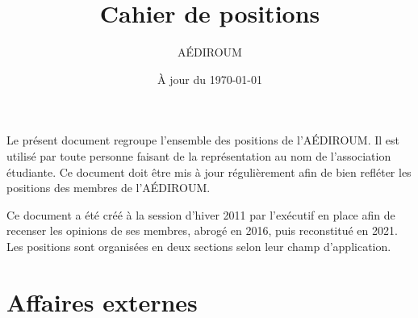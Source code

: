 \documentclass[twoside]{article}
\title{Cahier de positions}
\author{AÉDIROUM}
\date{À jour du \today}
\begin{document}
\maketitle

Le présent document regroupe l'ensemble des positions de l'AÉDIROUM. Il est utilisé par toute personne faisant de la représentation au nom de l'association étudiante. Ce document doit être mis à jour régulièrement afin de bien refléter les positions des membres de l'AÉDIROUM.

Ce document a été créé à la session d'hiver 2011 par l'exécutif en place afin de recenser les opinions de ses membres, abrogé en 2016, puis reconstitué en 2021. Les positions sont organisées en deux sections selon leur champ d'application.

\section{Affaires externes}
\end{document}

